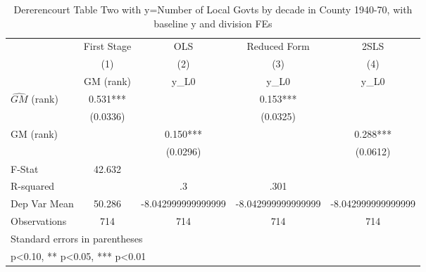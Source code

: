 \begin{table}[htbp]\centering
\def\sym#1{\ifmmode^{#1}\else\(^{#1}\)\fi}
\caption{Dererencourt Table Two with y=Number of Local Govts by decade in County 1940-70, with baseline y and division FEs}
\begin{tabular}{l*{4}{c}}
\toprule
                    & First Stage   &         OLS   &Reduced Form   &        2SLS   \\
                    &\multicolumn{1}{c}{(1)}&\multicolumn{1}{c}{(2)}&\multicolumn{1}{c}{(3)}&\multicolumn{1}{c}{(4)}\\
                    &\multicolumn{1}{c}{GM  (rank)}&\multicolumn{1}{c}{y\_L0}&\multicolumn{1}{c}{y\_L0}&\multicolumn{1}{c}{y\_L0}\\
\midrule
$\hat{GM}$ (rank)   &       0.531***&               &       0.153***&               \\
                    &    (0.0336)   &               &    (0.0325)   &               \\
\addlinespace
GM  (rank)          &               &       0.150***&               &       0.288***\\
                    &               &    (0.0296)   &               &    (0.0612)   \\
\midrule
F-Stat              &      42.632   &               &               &               \\
R-squared           &               &          .3   &        .301   &               \\
Dep Var Mean        &      50.286   &-8.042999999999999   &-8.042999999999999   &-8.042999999999999   \\
Observations        &         714   &         714   &         714   &         714   \\
\bottomrule
\multicolumn{5}{l}{\footnotesize Standard errors in parentheses}\\
\multicolumn{5}{l}{\footnotesize * p<0.10, ** p<0.05, *** p<0.01}\\
\end{tabular}
\end{table}
